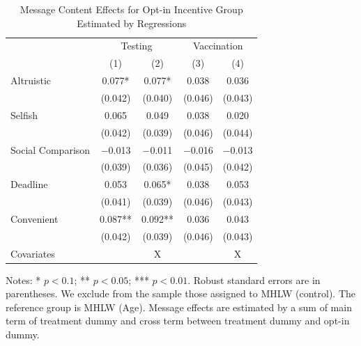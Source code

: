 \documentclass[
]{article}
\begin{document}
\begin{table}

\caption{\label{tab:lh-int-woA}Message Content Effects for Opt-in Incentive Group Estimated by Regressions}
\centering
\fontsize{9}{11}\selectfont
\begin{threeparttable}
\begin{tabular}[t]{lcccc}
\toprule
\multicolumn{1}{c}{ } & \multicolumn{2}{c}{Testing} & \multicolumn{2}{c}{Vaccination} \\
\cmidrule(l{3pt}r{3pt}){2-3} \cmidrule(l{3pt}r{3pt}){4-5}
  & (1) & (2) & (3) & (4)\\
\midrule
Altruistic & \num{0.077}* & \num{0.077}* & \num{0.038} & \num{0.036}\\
 & (\num{0.042}) & (\num{0.040}) & (\num{0.046}) & (\num{0.043})\\
Selfish & \num{0.065} & \num{0.049} & \num{0.038} & \num{0.020}\\
 & (\num{0.042}) & (\num{0.039}) & (\num{0.046}) & (\num{0.044})\\
Social Comparison & \num{-0.013} & \num{-0.011} & \num{-0.016} & \num{-0.013}\\
 & (\num{0.039}) & (\num{0.036}) & (\num{0.045}) & (\num{0.042})\\
Deadline & \num{0.053} & \num{0.065}* & \num{0.038} & \num{0.053}\\
 & (\num{0.041}) & (\num{0.039}) & (\num{0.046}) & (\num{0.043})\\
Convenient & \num{0.087}** & \num{0.092}** & \num{0.036} & \num{0.043}\\
 & (\num{0.042}) & (\num{0.039}) & (\num{0.046}) & (\num{0.043})\\
Covariates &  & X &  & X\\
\bottomrule
\end{tabular}
\begin{tablenotes}
\item Notes: * $p < 0.1$; ** $p < 0.05$; *** $p < 0.01$. Robust standard errors are in parentheses. We exclude from the sample those assigned to MHLW (control). The reference group is MHLW (Age). Message effects are estimated by a sum of main term of treatment dummy and cross term between treatment dummy and opt-in dummy.
\end{tablenotes}
\end{threeparttable}
\end{table}
\end{document}
